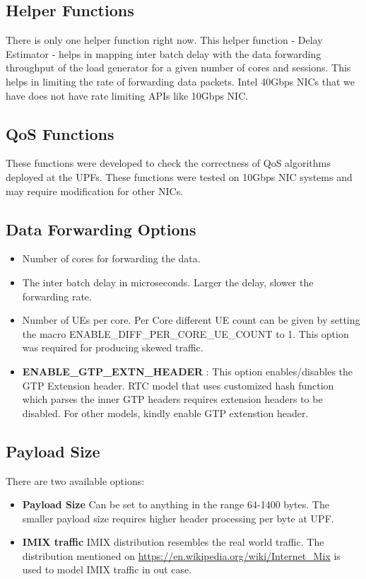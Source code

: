 \documentclass{article}
\begin{document}
\subsection{Helper Functions}
There is only one helper function right now. This helper function - Delay Estimator - helps in mapping inter batch delay with the data forwarding throughput of the load generator for a given number of cores and sessions. This helps in limiting the rate of forwarding data packets. Intel 40Gbps NICs that we have does not have rate limiting APIs like 10Gbps NIC.

\subsection{QoS Functions}
These functions were developed to check the correctness of QoS algorithms deployed at the UPFs. These functions were tested on 10Gbps NIC systems and may require modification for other NICs.

\subsection{Data Forwarding Options}
\begin{itemize}
    \item Number of cores for forwarding the data.
    \item The inter batch delay in microseconds. Larger the delay, slower the forwarding rate.
    \item Number of UEs per core. Per Core different UE count can be given by setting the macro ENABLE\_DIFF\_PER\_CORE\_UE\_COUNT to 1. This option was required for producing skewed traffic.
    \item \textbf{ENABLE\_GTP\_EXTN\_HEADER} : This option enables/disables the GTP Extension header. RTC model that uses customized hash function which parses the inner GTP headers requires extension headers to be disabled. For other models, kindly enable GTP extenstion header.
\end{itemize}
\subsection{Payload Size}
There are two available options:
\begin{itemize}
    \item \textbf{Payload Size} Can be set to anything in the range 64-1400 bytes. The smaller payload size requires higher header processing per byte at UPF.
    \item \textbf{IMIX traffic} IMIX distribution resembles the real world traffic. The distribution mentioned on \url{https://en.wikipedia.org/wiki/Internet_Mix} is used to model IMIX traffic in out case.
\end{itemize}
\end{document}
